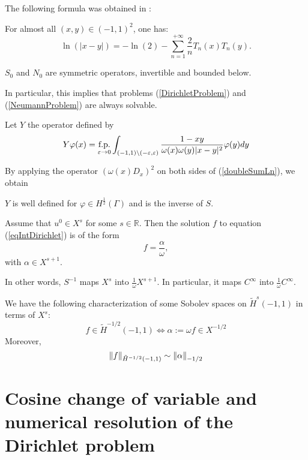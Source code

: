 \documentclass[10pt,a4paper]{article}
\begin{document}
The following formula was obtained in \cite{jerez2010boundary}:
\begin{Cor}
	For almost all $(x,y) \in (-1,1)^2$, one has: 
	\begin{equation}
		\ln(|x-y|) = -\ln(2) - \sum_{n=1}^{+\infty}\frac{2}{n} T_n(x)T_n(y).
		\label{doubleSumLn}
	\end{equation}
\end{Cor}

\begin{Cor}
	$S_0$ and $N_0$ are symmetric operators, invertible and bounded below. 
\end{Cor}

In particular, this implies that problems (\ref{DirichletProblem}) and (\ref{NeumannProblem}) are always solvable. 

Let $Y$ the operator defined by 
\[Y\varphi(x) = \underset{\varepsilon \to 0}{\textup{f.p.}} \int_{(-1,1)\setminus(-\varepsilon,\varepsilon)} \frac{1-xy}{\omega(x)\omega(y)|x-y|^2}\varphi(y)dy\]

By applying the operator $(\omega(x) D_x)^2$ on both sides of (\ref{doubleSumLn}), we obtain
\begin{Cor}
	$Y$ is well defined for $\varphi \in H^{\frac{1}{2}}(\Gamma)$ and is the inverse of $S$.
\end{Cor}

\begin{Cor}
	Assume that $u^0 \in X^s$ for some $s \in \mathbb{R}$. Then the solution $f$ to equation (\ref{eqIntDirichlet}) is of the form 
	\[f = \frac{\alpha}{\omega},\] 
	with $\alpha \in X^{s+1}$. 
\end{Cor}
In other words, $S^{-1}$ maps $X^s$ into $\frac{1}{\omega}X^{s+1}$. In particular, it maps $C^{\infty}$ into $\frac{1}{\omega}C^{\infty}$. 

\begin{The}
	 We have the following characterization of some Sobolev spaces on $\tilde{H}^s(-1,1)$ in terms of $X^s$:
	\begin{equation}
	 	f \in \tilde{H}^{-1/2}(-1,1) \iff \alpha := \omega f \in X^{-1/2} 
 	\end{equation}
 	Moreover, 
 	\[ \left\|f\right\|_{\tilde{H}^{-1/2}(-1,1)} \sim \left\|\alpha\right\|_{-1/2}\]
 	\label{EquivalenceNorm}
\end{The}

\section{Cosine change of variable and numerical resolution of the Dirichlet problem}
\end{document}
